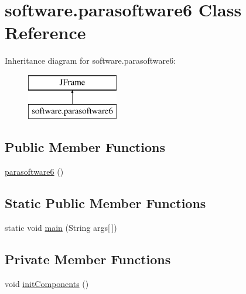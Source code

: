 \hypertarget{classsoftware_1_1parasoftware6}{}\section{software.\+parasoftware6 Class Reference}
\label{classsoftware_1_1parasoftware6}
Inheritance diagram for software.\+parasoftware6\+:\begin{figure}[H]
\begin{center}
\leavevmode
\includegraphics[height=2.000000cm]{classsoftware_1_1parasoftware6}
\end{center}
\end{figure}
\subsection*{Public Member Functions}
\begin{DoxyCompactItemize}
\item 
\mbox{\hyperlink{classsoftware_1_1parasoftware6_a6fb366aeceab3c73f162d273e6b2565e}{parasoftware6}} ()
\end{DoxyCompactItemize}
\subsection*{Static Public Member Functions}
\begin{DoxyCompactItemize}
\item 
static void \mbox{\hyperlink{classsoftware_1_1parasoftware6_a3fe3a82fe5555adc90d4ead4b3078435}{main}} (String args\mbox{[}$\,$\mbox{]})
\end{DoxyCompactItemize}
\subsection*{Private Member Functions}
\begin{DoxyCompactItemize}
\item 
void \mbox{\hyperlink{classsoftware_1_1parasoftware6_a7e8012356c324152156d2bea5c2cc82f}{init\+Components}} ()
\end{DoxyCompactItemize}
